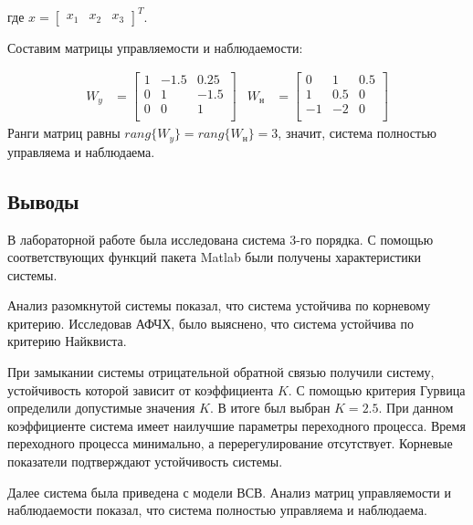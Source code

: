 \documentclass[a4paper, 12pt]{article}
\begin{document}
где $x = \begin{bmatrix} x_1 & x_2 & x_3 \end{bmatrix}^T$.
\par
Составим матрицы управляемости и наблюдаемости:

\begin{align*}
    W_y & = \begin{bmatrix}
        1 & -1.5 & 0.25\\
        0 & 1 & -1.5\\
        0 & 0 & 1\\
    \end{bmatrix} & 
    W_\text{н} & = \begin{bmatrix}
        0 & 1 & 0.5\\
        1 & 0.5 & 0\\
        -1 & -2 & 0\\
    \end{bmatrix}
\end{align*}
Ранги матриц равны $rang\{W_y\}=rang\{W_\text{н}\}=3$, значит, система полностью управляема и наблюдаема.

\newpage
\begin{center}
\section*{Выводы}
\end{center} \par
В лабораторной работе была исследована система 3-го порядка. С помощью соответствующих функций пакета Matlab были получены характеристики системы. 
\par 
Анализ разомкнутой системы показал, что система устойчива по корневому критерию. Исследовав АФЧХ, было выяснено, что система устойчива по критерию Найквиста.
\par 
При замыкании системы отрицательной обратной связью получили систему, устойчивость которой зависит от коэффициента $K$. С помощью критерия Гурвица определили допустимые значения $K$. В итоге был выбран $K=2.5$. При данном коэффициенте система имеет наилучшие параметры переходного процесса. Время переходного процесса минимально, а перерегулирование отсутствует. Корневые показатели подтверждают устойчивость системы.
\par 
Далее система была приведена с модели ВСВ. Анализ матриц управляемости и наблюдаемости показал, что система полностью управляема и наблюдаема.
\end{document}
